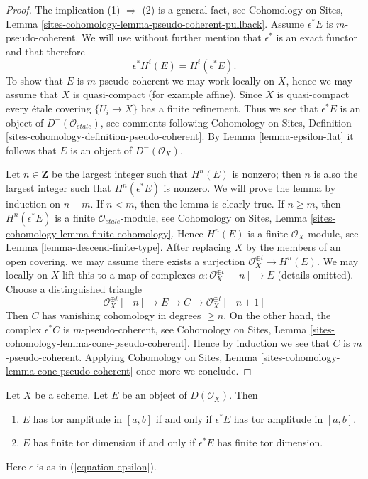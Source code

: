 \begin{proof}
The implication (1) $\Rightarrow$ (2) is a general fact, see
Cohomology on Sites, Lemma
\ref{sites-cohomology-lemma-pseudo-coherent-pullback}.
Assume $\epsilon^*E$ is $m$-pseudo-coherent.
We will use without further mention that $\epsilon^*$ is
an exact functor and that therefore
$$
\epsilon^*H^i(E) = H^i(\epsilon^*E).
$$
To show that $E$ is $m$-pseudo-coherent we may work locally on $X$,
hence we may assume that $X$ is quasi-compact (for example affine).
Since $X$ is quasi-compact every \'etale covering $\{U_i \to X\}$
has a finite refinement. Thus we see that $\epsilon^*E$ is
an object of $D^{-}(\mathcal{O}_{\acute{e}tale})$, see
comments following
Cohomology on Sites, Definition
\ref{sites-cohomology-definition-pseudo-coherent}.
By Lemma \ref{lemma-epsilon-flat} it follows that $E$ is an object of
$D^-(\mathcal{O}_X)$.

\medskip\noindent
Let $n \in \mathbf{Z}$ be the largest integer such that
$H^n(E)$ is nonzero; then $n$ is also the largest integer
such that $H^n(\epsilon^*E)$ is nonzero.
We will prove the lemma by induction on $n - m$.
If $n < m$, then the lemma is clearly true.
If $n \geq m$, then $H^n(\epsilon^*E)$ is a finite
$\mathcal{O}_{\acute{e}tale}$-module, see
Cohomology on Sites, Lemma \ref{sites-cohomology-lemma-finite-cohomology}.
Hence $H^n(E)$ is a finite $\mathcal{O}_X$-module, see
Lemma \ref{lemma-descend-finite-type}.
After replacing $X$ by the members of an open covering, we may
assume there exists a surjection $\mathcal{O}_X^{\oplus t} \to H^n(E)$.
We may locally on $X$ lift this to a map of complexes
$\alpha : \mathcal{O}_X^{\oplus t}[-n] \to E$ (details omitted).
Choose a distinguished triangle
$$
\mathcal{O}_X^{\oplus t}[-n] \to E \to C \to \mathcal{O}_X^{\oplus t}[-n + 1]
$$
Then $C$ has vanishing cohomology in degrees $\geq n$. On the other hand, the
complex $\epsilon^*C$ is $m$-pseudo-coherent, see
Cohomology on Sites, Lemma \ref{sites-cohomology-lemma-cone-pseudo-coherent}.
Hence by induction we see that $C$ is $m$-pseudo-coherent. Applying
Cohomology on Sites, Lemma \ref{sites-cohomology-lemma-cone-pseudo-coherent}
once more we conclude.
\end{proof}

\begin{lemma}
\label{lemma-descend-tor-amplitude}
Let $X$ be a scheme. Let $E$ be an object of $D(\mathcal{O}_X)$.
Then
\begin{enumerate}
\item $E$ has tor amplitude in $[a, b]$ if and only if
$\epsilon^*E$ has tor amplitude in $[a, b]$.
\item $E$ has finite tor dimension if and only if $\epsilon^*E$ has finite
tor dimension.
\end{enumerate}
Here $\epsilon$ is as in (\ref{equation-epsilon}).
\end{lemma}

